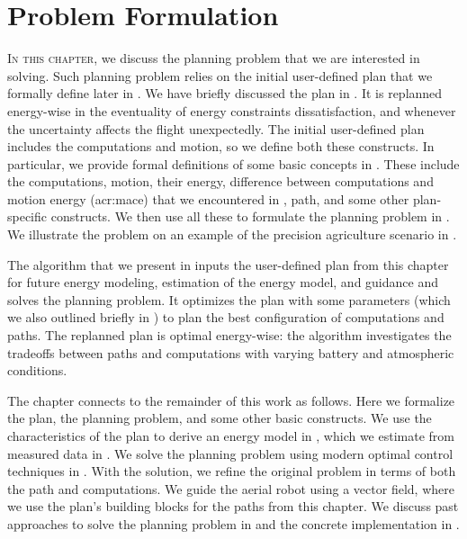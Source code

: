 
\chapter{Problem Formulation}
\label{cp:pb}

\lettrine{I}{n this chapter}, we discuss the planning problem that we are interested in solving. Such planning problem relies on the initial user-defined plan that we formally define later in . We have briefly discussed the plan in . It is replanned energy-wise in the eventuality of energy constraints dissatisfaction, and whenever the uncertainty affects the flight unexpectedly. The initial user-defined plan includes the computations and motion, so we define both these constructs. In particular, we provide formal definitions of some basic concepts in . These include the computations, motion, their energy, difference between computations and motion energy (\Gls{acr:mace}) that we encountered in , path, and some other plan-specific constructs. We then use all these to formulate the planning problem in . We illustrate the problem on an example of the precision agriculture scenario in .

The algorithm that we present in  inputs the user-defined plan from this chapter for future energy modeling, estimation of the energy model, and guidance and solves the planning problem. It optimizes the plan with some parameters (which we also outlined briefly in ) to plan the best configuration of computations and paths. The replanned plan is optimal energy-wise: the algorithm investigates the tradeoffs between paths and computations with varying battery and atmospheric conditions.

The chapter connects to the remainder of this work as follows. Here we formalize the plan, the planning problem, and some other basic constructs. We use the characteristics of the plan to derive an energy model in , which we estimate from measured data in . We solve the planning problem using modern optimal control techniques in . With the solution, we refine the original problem in terms of both the path and computations. We guide the aerial robot using a vector field, where we use the plan's building blocks for the paths from this chapter. We discuss past approaches to solve the planning problem in  and the concrete implementation in .


